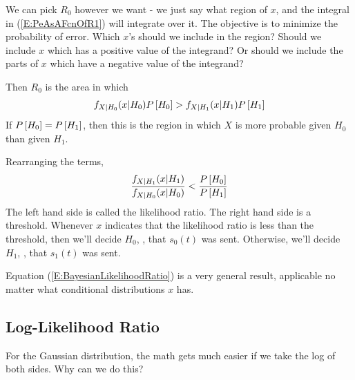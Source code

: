 
We can pick $R_0$ however we want - we just say what region of $x$,
and the integral in (\ref{E:PeAsAFcnOfR1}) will integrate over it.
The objective is to minimize the probability of error.  Which $x$'s
should we include in the region?  Should we include $x$ which has a
positive value of the integrand?  Or should we include the parts of
$x$ which have a negative value of the integrand?


Then $R_0$ is the area in which
\[
  f_{X|H_0}(x|H_0) P\left[{H_0}\right] > f_{X|H_1}(x|H_1) P\left[{H_1}\right]
\]
If $P\left[{H_0}\right] = P\left[{H_1}\right]$, then this is the region in which $X$ is
more probable given $H_0$ than given $H_1$.

Rearranging the terms,
\begin{equation} \label{E:BayesianLikelihoodRatio}
  \frac{f_{X|H_1}(x|H_1)}{f_{X|H_0}(x|H_0)}  < \frac{P\left[{H_0}\right]}{ P\left[{H_1}\right]}
\end{equation}
The left hand side is called the likelihood ratio.  The right hand
side is a threshold.  Whenever $x$ indicates that the likelihood
ratio is less than the threshold, then we'll decide $H_0$, \ie, that
$s_0(t)$ was sent.  Otherwise, we'll decide $H_1$, \ie, that
$s_1(t)$ was sent.

Equation (\ref{E:BayesianLikelihoodRatio}) is a very general result,
applicable no matter what conditional distributions $x$ has.

\subsection{Log-Likelihood Ratio}

For the Gaussian distribution, the math gets much easier if we take
the log of both sides.  Why can we do this?


